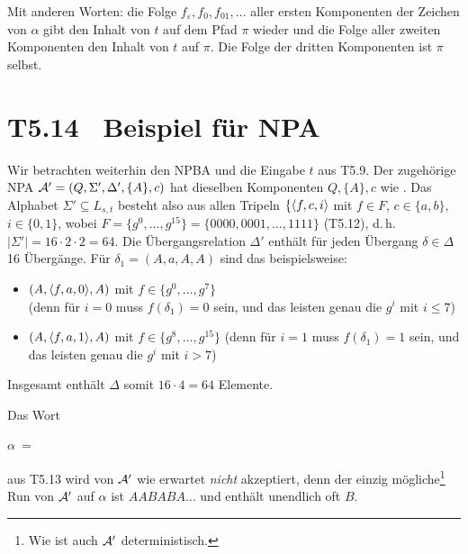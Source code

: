 \documentclass[fontsize=11pt, twoside=false, numbers=autoenddot]{scrbook}
\begin{document}
Mit anderen Worten: die Folge $f_\varepsilon,f_0,f_{01},\dots$
aller ersten Komponenten der Zeichen von $\alpha$ gibt den Inhalt von $t$
auf dem Pfad $\pi$ wieder und die Folge aller zweiten Komponenten 
den Inhalt von $t$ auf $\pi$. Die Folge der dritten Komponenten
ist $\pi$ selbst.

\section*{T5.14~ Beispiel für NPA}

\enlargethispage*{20mm}
Wir betrachten weiterhin den NPBA \Amc und die Eingabe $t$ aus T5.9.
Der zugehörige NPA $\mathcal{A}' = (Q, \Sigma', \Delta', \{A\}, c)$
hat dieselben Komponenten $Q,\{A\},c$ wie \Amc.
Das Alphabet $\Sigma' \subseteq L_{s,t}$ besteht also aus allen Tripeln
$\{\langle f,c,i\rangle$ mit $f \in F$, $c \in \{a,b\}$, $i \in \{0,1\}$,
wobei $F = \{g^0,\dots,g^{15}\} = \{0000,0001,\dots,1111\}$ (T5.12),
d.\,h.\ $|\Sigma'| = 16 \cdot 2 \cdot 2 = 64$.
%
Die Übergangsrelation $\Delta'$ enthält für jeden Übergang $\delta \in \Delta$
16 Übergänge. Für $\delta_1 = (A,a,A,A)$ sind das beispielsweise:
%
\begin{itemize}
  \item
    $(A, \langle f,a,0\rangle, A)$ mit $f \in \{g^0,\dots,g^7\}$ \\
    (denn für $i=0$ muss $f(\delta_1)=0$ sein, und das leisten genau die $g^i$ mit $i \leq 7$)
  \item
    $(A, \langle f,a,1\rangle, A)$ mit $f \in \{g^8,\dots,g^{15}\}$
    (denn für $i=1$ muss $f(\delta_1)=1$ sein, und das leisten genau die $g^i$ mit $i > 7$)
\end{itemize}
%
Insgesamt enthält $\Delta$ somit $16 \cdot 4 = 64$ Elemente.

Das Wort
%
\begin{center}
  $\alpha ~= {}$
  \newcommand{\Tripel}[3]{
    $\left\langle
      \begin{array}{@{}c@{}}#1\\[-1pt]#2\\[-1pt]#3\end{array}\,%
    \right\rangle$
  }%
\end{center}
%
aus T5.13 wird von $\mathcal{A}'$ wie erwartet \emph{nicht} akzeptiert,
denn der einzig mögliche\footnote{Wie \Amc ist auch $\mathcal{A}'$ deterministisch.}
Run von $\mathcal{A}'$ auf $\alpha$ ist
$AABABA\dots$ und enthält unendlich oft $B$.
\end{document}
